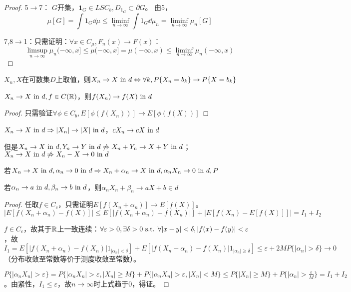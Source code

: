 \documentclass{ctexart}
\begin{document}
\begin{proof}
  5$\to$7： $G$开集，$\bm{1}_{G}\in LSC_{b},D_{1_{G}}\subset \partial G$。
  由5，\[\mu[G]=\int 1_{G}\dd\mu\leq \liminf_{n\to\infty}\int 1_{G}\dd\mu_{n}=\liminf_{n\to\infty}\mu_{n}[G]\]

  7,8$\to $1：只需证明：$\forall x\in C_{\mu}, F_{n}(x)\to F(x)$：
  \[\limsup_{n\to\infty}\mu_{n}(-\infty,x]\leq \mu(-\infty,x]=\mu(-\infty,x)\leq\liminf\limits_{n\to\infty}\mu_{n}(-\infty,x)\]
\end{proof}

\begin{Eg}
  $X_{n},X$在可数集$D$上取值，则$X_{n}\to X\text{ in } d\Leftrightarrow \forall k, P\{X_{n}=b_{k}\}\to P\{X=b_{k}\}$
\end{Eg}

\begin{Eg}
  $X_{n}\to X\text{ in } d,f\in C(\mathbb{R})$，则$f(X_{n})\to f(X)\text{ in } d$
\end{Eg}
\begin{proof}
  只需验证$\forall \phi\in C_{b}, E[\phi(f(X_{n}))]\to E[\phi(f(X))]$
\end{proof}

\begin{Eg}
  $X_{n}\to X\text{ in } d\Rightarrow |X_{n}|\to |X|\text{ in } d$，$cX_{n}\to cX\text{ in } d$

  但是$X_{n}\to X\text{ in } d,Y_{n}\to Y\text{ in } d\not\Rightarrow X_{n}+Y_{n}\to X+Y\text{ in } d$；$X_{n}\to X\text{ in } d\not\Rightarrow X_{n}-X\to 0\text{ in } d$
\end{Eg}
\begin{Eg}
  若$X_{n}\to X\text{ in } d,\alpha_{n}\to 0\text{ in } d\Rightarrow X_{n}+\alpha_{n}\to X\text{ in } d, \alpha_{n}X_{n}\to 0\text{ in } d,P$

  若$\alpha_{n}\to a\text{ in } d,\beta_{n}\to b\text{ in } d$，则$\alpha_{n}X_{n}+\beta_{n}\to aX+b\in d$
\end{Eg}

\begin{proof}
任取$f\in C_{c}$，只需证明$E[f(X_{n}+\alpha_{n})]\to E[f(X)]$。$|E[f(X_{n}+\alpha_{n})-f(X)]|\leq E[|f(X_{n}+\alpha_{n})-f(X_{n})|]+|E[f(X_{n})-E[f(X)]]|=I_{1}+I_{2}$

$f\in C_{c}$，故其于$\mathbb{R}$上一致连续：$\forall\varepsilon>0,\exists \delta>0\text{ s.t. }\forall|x-y|<\delta,|f(x)-f(y)|<\varepsilon$，故$I_{1}=E[|f(X_{n}+\alpha_{n})-f(X_{n})|1_{|\alpha_{n}|<\delta}]+E[|f(X_{n}+\alpha_{n})-f(X_{n})|1_{|\alpha_{n}|\geq\delta}]\leq \varepsilon+2MP\{|\alpha_{n}|>\delta\}\to 0$（分布收敛至常数等价于测度收敛至常数）。

$P\{|\alpha_{n}X_{n}|>\varepsilon\}=P\{|\alpha_{n}X_{n}|>\varepsilon,|X_{n}|\geq M\}+P\{|\alpha_{n}X_{n}|>\varepsilon, |X_{n}|<M\}\leq P\{|X_{n}|\geq M\}+P\{|\alpha_{n}|>\frac{\varepsilon}{M}\}=I_{1}+I_{2}$。由紧性，$I_{1}\leq\varepsilon$，故$n\to\infty$时上式趋于0，得证。
\end{proof}
\end{document}

